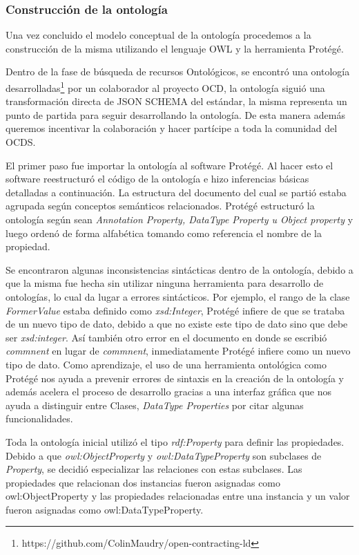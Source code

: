 \subsubsection{Construcción de la ontología}

Una vez concluido el modelo conceptual de la ontología procedemos a la construcción de la misma utilizando el lenguaje OWL y la herramienta Protégé.

Dentro de la fase de búsqueda de recursos Ontológicos, se encontró una ontología desarrolladas\footnote{https://github.com/ColinMaudry/open-contracting-ld} por un colaborador al proyecto OCD, la ontología siguió una transformación directa de JSON SCHEMA del estándar, la misma representa un punto de partida para seguir desarrollando la ontología. De esta manera además queremos incentivar la colaboración y hacer partícipe a toda la comunidad del OCDS.

El primer paso fue importar la ontología al software Protégé. Al hacer esto el software reestructuró el código de la ontología e hizo inferencias básicas detalladas a continuación. La estructura del documento del cual se partió estaba agrupada según conceptos semánticos relacionados. Protégé estructuró la ontología según sean \textit{Annotation Property, DataType Property u Object property} y luego ordenó de forma alfabética tomando como referencia el nombre de la propiedad.

Se encontraron algunas inconsistencias sintácticas dentro de la ontología, debido a que la misma fue hecha sin utilizar ninguna herramienta para desarrollo de ontologías, lo cual da lugar a errores sintácticos. Por ejemplo, el rango de la clase \textit{FormerValue} estaba definido como \textit{xsd:Integer}, Protégé infiere de que se trataba de un nuevo tipo de dato,  debido a que no existe este tipo de dato sino que debe ser \textit{xsd:integer}. Así también otro error en el documento en donde se escribió \textit{commnent} en lugar de \textit{commnent}, inmediatamente Protégé infiere como un nuevo tipo de dato. Como aprendizaje, el uso de una herramienta ontológica como Protégé nos ayuda a prevenir errores de sintaxis en la creación de la ontología y además acelera el proceso de desarrollo gracias a una interfaz gráfica que nos ayuda a distinguir entre Clases, \textit{DataType Properties} por citar algunas funcionalidades.

Toda la ontología inicial utilizó el tipo \textit{rdf:Property} para definir las propiedades. Debido a que \textit{owl:ObjectProperty} y \textit{owl:DataTypeProperty} son subclases de \textit{Property}, se decidió especializar las relaciones con estas subclases. Las propiedades que relacionan dos instancias fueron asignadas como owl:ObjectProperty y las propiedades relacionadas entre una instancia y un valor fueron asignadas como owl:DataTypeProperty.

